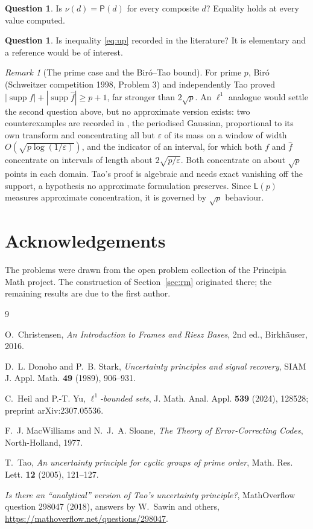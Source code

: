 \documentclass[11pt,reqno]{amsart}
\theoremstyle{plain}
\theoremstyle{definition}
\newtheorem{question}[theorem]{Question}
\theoremstyle{remark}
\newtheorem{remark}[theorem]{Remark}
\DeclareMathOperator{\supp}{supp}
\newcommand{\Lb}{\mathsf{L}}
\newcommand{\Pp}{\mathsf{P}}
\begin{document}
\begin{question}
Is $\nu(d)=\Pp(d)$ for every composite $d$?  Equality holds at every
value computed.
\end{question}

\begin{question}
Is inequality \eqref{eq:up} recorded in the literature?  It is
elementary and a reference would be of interest.
\end{question}

\begin{remark}[The prime case and the Bir\'o--Tao bound]
For prime $p$, Bir\'o (Schweitzer competition 1998, Problem 3) and
independently Tao \cite{Tao} proved
$|\supp f|+|\supp\widehat f|\ge p+1$, far stronger than
$2\sqrt p$.  An $\ell^1$ analogue would settle the second question
above, but no approximate version exists: two counterexamples are
recorded in \cite{MO}, the periodised Gaussian, proportional to its own
transform and concentrating all but $\varepsilon$ of its mass on a
window of width $O(\sqrt{p\log(1/\varepsilon)})$, and the indicator of
an interval, for which both $f$ and $\widehat f$ concentrate on
intervals of length about $2\sqrt{p/\varepsilon}$.  Both concentrate on
about $\sqrt p$ points in each domain.  Tao's proof is algebraic and
needs exact vanishing off the support, a hypothesis no approximate
formulation preserves.  Since $\Lb(p)$ measures approximate
concentration, it is governed by $\sqrt p$ behaviour.
\end{remark}

\section*{Acknowledgements}

The problems were drawn from the open problem collection of the
Principia Math project.  The construction of Section~\ref{sec:rm}
originated there; the remaining results are due to the first author.

\begin{thebibliography}{9}

O.~Christensen,
\emph{An Introduction to Frames and Riesz Bases},
2nd ed., Birkh\"auser, 2016.

D.~L. Donoho and P.~B. Stark,
\emph{Uncertainty principles and signal recovery},
SIAM J. Appl. Math. \textbf{49} (1989), 906--931.

C.~Heil and P.-T. Yu,
\emph{$\ell^1$-bounded sets},
J. Math. Anal. Appl. \textbf{539} (2024), 128528;
preprint arXiv:2307.05536.

F.~J. MacWilliams and N.~J.~A. Sloane,
\emph{The Theory of Error-Correcting Codes},
North-Holland, 1977.

T.~Tao,
\emph{An uncertainty principle for cyclic groups of prime order},
Math. Res. Lett. \textbf{12} (2005), 121--127.

\emph{Is there an ``analytical'' version of Tao's uncertainty
principle?}, MathOverflow question 298047 (2018), answers by W.~Sawin
and others, \url{https://mathoverflow.net/questions/298047}.

\end{thebibliography}
\end{document}
